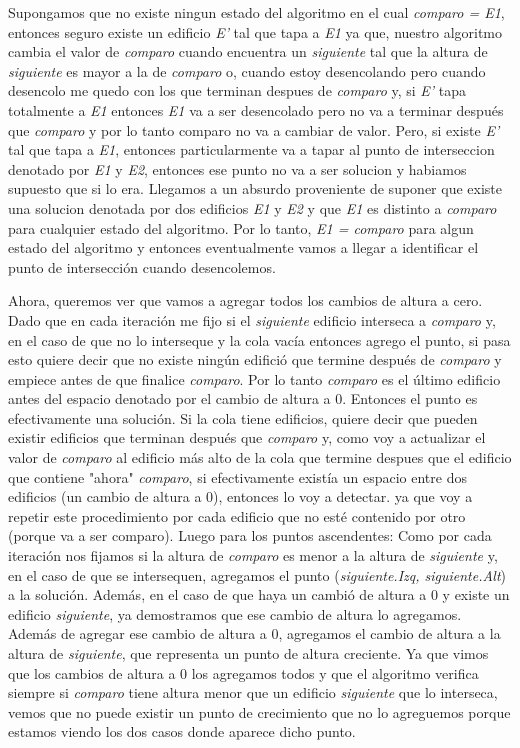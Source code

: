 \documentclass{article}
\begin{document}
Supongamos que no existe ningun estado del algoritmo en el cual \textit{comparo = E1}, entonces seguro existe un edificio \textit{E'} tal que tapa a \textit{E1} ya que, nuestro algoritmo cambia el valor de \textit{comparo} cuando encuentra un \textit{siguiente} tal que la altura de \textit{siguiente} es mayor a la de \textit{comparo} o, cuando estoy desencolando pero cuando desencolo me quedo con los que terminan despues de \textit{comparo} y, si \textit{E'} tapa totalmente a \textit{E1} entonces \textit{E1} va a ser desencolado pero no va a terminar después que \textit{comparo} y por lo tanto comparo no va a cambiar de valor. Pero, si existe \textit{E'} tal que tapa a \textit{E1}, entonces particularmente va a tapar al punto de interseccion denotado por \textit{E1} y \textit{E2}, entonces ese punto no va a ser solucion y habiamos supuesto que si lo era. Llegamos a un absurdo proveniente de suponer que existe una solucion denotada por dos edificios \textit{E1} y \textit{E2} y que \textit{E1} es distinto a \textit{comparo} para cualquier estado del algoritmo. Por lo tanto, \textit{E1 = comparo} para algun estado del algoritmo y entonces eventualmente vamos a llegar a identificar el punto de intersección cuando desencolemos.


Ahora, queremos ver que vamos a agregar todos los cambios de altura a cero.
Dado que en cada iteración me fijo si el \textit{siguiente} edificio interseca a \textit{comparo} y, en el caso de que no lo interseque y la cola vacía entonces agrego el punto, si pasa esto quiere decir que no existe ningún edifició que termine después de \textit{comparo} y empiece antes de que finalice \textit{comparo}. Por lo tanto \textit{comparo} es el último edificio antes del espacio denotado por el cambio de altura a 0. Entonces el punto es efectivamente una solución. \newline
Si la cola tiene edificios, quiere decir que pueden existir edificios que terminan después que \textit{comparo} y, como voy a actualizar el valor de \textit{comparo} al edificio más alto de la cola que termine despues que el edificio que contiene "ahora" \textit{comparo}, si efectivamente existía un espacio entre dos edificios (un cambio de altura a 0), entonces lo voy a detectar. ya que voy a repetir este procedimiento por cada edificio que no esté contenido por otro (porque va a ser comparo).
Luego para los puntos ascendentes:
Como por cada iteración nos fijamos si la altura de \textit{comparo} es menor a la altura de \textit{siguiente} y, en el caso de que se intersequen, agregamos el punto (\textit{siguiente.Izq, siguiente.Alt}) a la solución.\newline
 Además, en el caso de que haya un cambió de altura a 0 y existe un edificio \textit{siguiente}, ya demostramos que ese cambio de altura lo agregamos. Además de agregar ese cambio de altura a 0, agregamos el cambio de altura a la altura de \textit{siguiente}, que representa un punto de altura creciente. Ya que vimos que los cambios de altura a 0 los agregamos todos y que el algoritmo verifica siempre si \textit{comparo} tiene altura menor que un edificio \textit{siguiente} que lo interseca, vemos que no puede existir un punto de crecimiento que no lo agreguemos porque estamos viendo los dos casos donde aparece dicho punto.
 
\end{document}
